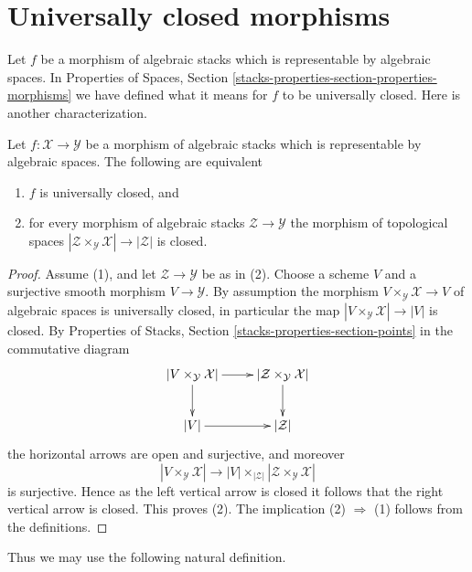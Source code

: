 \section{Universally closed morphisms}
\label{section-universally-closed}

\noindent
Let $f$ be a morphism of algebraic stacks which is representable by
algebraic spaces. In
Properties of Spaces,
Section \ref{stacks-properties-section-properties-morphisms}
we have defined what it means for $f$ to be universally closed.
Here is another characterization.

\begin{lemma}
\label{lemma-characterize-representable-universally-closed}
Let $f : \mathcal{X} \to \mathcal{Y}$ be a morphism of
algebraic stacks which is representable by algebraic spaces.
The following are equivalent
\begin{enumerate}
\item $f$ is universally closed, and
\item for every morphism of algebraic stacks $\mathcal{Z} \to \mathcal{Y}$
the morphism of topological spaces
$|\mathcal{Z} \times_\mathcal{Y} \mathcal{X}| \to |\mathcal{Z}|$ is closed.
\end{enumerate}
\end{lemma}

\begin{proof}
Assume (1), and let $\mathcal{Z} \to \mathcal{Y}$ be as in (2).
Choose a scheme $V$ and a surjective smooth morphism $V \to \mathcal{Y}$.
By assumption the morphism $V \times_\mathcal{Y} \mathcal{X} \to V$
of algebraic spaces is universally closed, in particular the map
$|V \times_\mathcal{Y} \mathcal{X}| \to |V|$ is closed. By
Properties of Stacks, Section \ref{stacks-properties-section-points}
in the commutative diagram
$$
\xymatrix{
|V \times_\mathcal{Y} \mathcal{X}| \ar[r] \ar[d] &
|\mathcal{Z} \times_\mathcal{Y} \mathcal{X}| \ar[d] \\
|V| \ar[r] & |\mathcal{Z}|
}
$$
the horizontal arrows are open and surjective, and moreover
$$
|V \times_\mathcal{Y} \mathcal{X}| \longrightarrow
|V| \times_{|\mathcal{Z}|} |\mathcal{Z} \times_\mathcal{Y} \mathcal{X}|
$$
is surjective. Hence as the left vertical arrow is closed it follows that
the right vertical arrow is closed. This proves (2).
The implication (2) $\Rightarrow$ (1) follows from the definitions.
\end{proof}

\noindent
Thus we may use the following natural definition.

